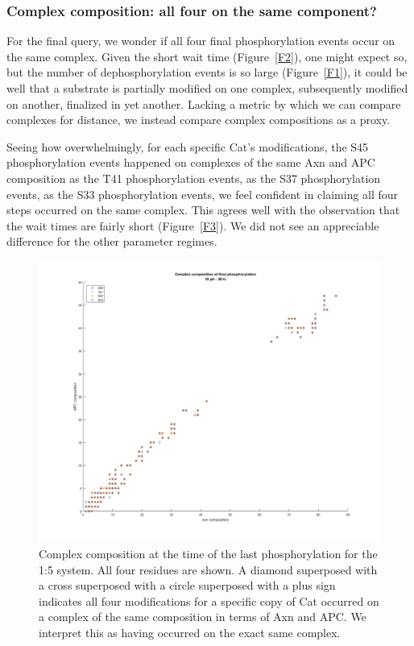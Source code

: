 \subsubsection{Complex composition: all four on the same component?}

For the final query, we wonder if all four final phosphorylation
events occur on the same complex. Given the short wait time
(Figure~\ref{F2}), one might expect so, but the number of
dephosphorylation events is so large (Figure~\ref{F1}), it could be
well that a substrate is partially modified on one complex,
subsequently modified on another, finalized in yet another. Lacking a
metric by which we can compare complexes for distance, we instead
compare complex compositions as a proxy.

Seeing how overwhelmingly, for each specific Cat’s modifications, the
S45 phosphorylation events happened on complexes of the same Axn and
APC composition as the T41 phosphorylation events, as the S37
phosphorylation events, as the S33 phosphorylation events, we feel
confident in claiming all four steps occurred on the same
complex. This agrees well with the observation that the wait times are
fairly short (Figure~\ref{F3}). We did not see an appreciable
difference for the other parameter regimes.

\begin{figure}[p]
  \centering
  \includegraphics[scale=0.32]{wnt/F10_complex_composition_10_50}
  \caption{Complex composition at the time of the last phosphorylation
    for the 1:5 system. All four residues are shown. A diamond
    superposed with a cross superposed with a circle superposed with a
    plus sign indicates all four modifications for a specific copy of
    Cat occurred on a complex of the same composition in terms of Axn
    and APC. We interpret this as having occurred on the exact same
    complex.}
  \label{F10}
\end{figure}

